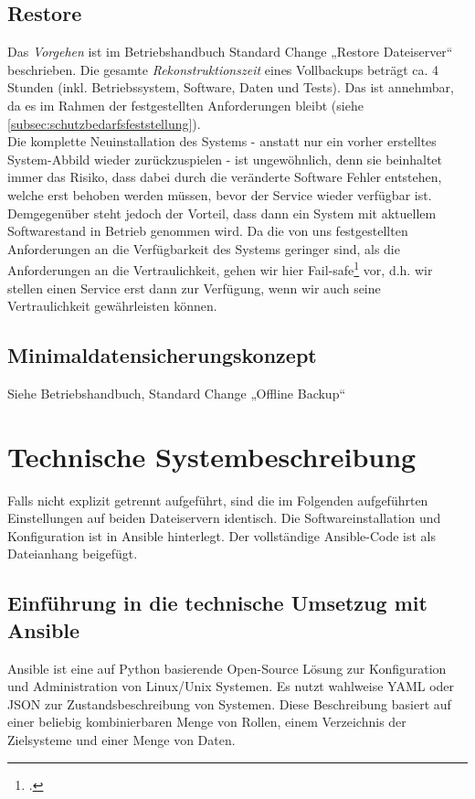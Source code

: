 \subsection{Restore}
\label{subsec:restore}
Das \emph{Vorgehen} ist im Betriebshandbuch Standard Change „Restore Dateiserver“ beschrieben. Die gesamte \emph{Rekonstruktionszeit} eines Vollbackups beträgt ca. 4 Stunden (inkl. Betriebssystem, Software, Daten und Tests). Das ist annehmbar, da es im Rahmen der festgestellten Anforderungen bleibt (siehe \ref{subsec:schutzbedarfsfeststellung}). \\

Die komplette Neuinstallation des Systems - anstatt nur ein vorher erstelltes System-Abbild wieder zurückzuspielen - ist ungewöhnlich, denn sie beinhaltet immer das Risiko, dass dabei durch die veränderte Software Fehler entstehen, welche erst behoben werden müssen, bevor der Service wieder verfügbar ist. Demgegenüber steht jedoch der Vorteil, dass dann ein System mit aktuellem Softwarestand in Betrieb genommen wird. Da die von uns festgestellten Anforderungen an die Verfügbarkeit des Systems geringer sind, als die Anforderungen an die Vertraulichkeit, gehen wir hier Fail-safe\footcite{wikiFailsafe} vor, d.h. wir stellen einen Service erst dann zur Verfügung, wenn wir auch seine Vertraulichkeit gewährleisten können.

\subsection{Minimaldatensicherungskonzept}
Siehe Betriebshandbuch, Standard Change „Offline Backup“

\newpage
\section{Technische Systembeschreibung}
\label{sec:techsys}
Falls nicht explizit getrennt aufgeführt, sind die im Folgenden aufgeführten Einstellungen auf beiden Dateiservern identisch. Die Softwareinstallation und Konfiguration ist in Ansible hinterlegt. Der vollständige Ansible-Code ist als Dateianhang beigefügt.

\subsection{Einführung in die technische Umsetzug mit Ansible}
\label{subsec:ansiblecode}
Ansible ist eine auf Python basierende Open-Source Lösung zur Konfiguration und Administration von Linux/Unix Systemen. Es nutzt wahlweise YAML oder JSON zur Zustandsbeschreibung von Systemen. Diese Beschreibung basiert auf einer beliebig kombinierbaren Menge von Rollen, einem Verzeichnis der Zielsysteme und einer Menge von Daten.

